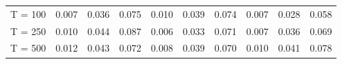 % 
\begin{tabular}{cccccccccc}
  \hline
  \hline
T = 100 & 0.007 & 0.036 & 0.075 & 0.010 & 0.039 & 0.074 & 0.007 & 0.028 & 0.058 \\ 
  T = 250 & 0.010 & 0.044 & 0.087 & 0.006 & 0.033 & 0.071 & 0.007 & 0.036 & 0.069 \\ 
  T = 500 & 0.012 & 0.043 & 0.072 & 0.008 & 0.039 & 0.070 & 0.010 & 0.041 & 0.078 \\ 
   \hline
\end{tabular}
